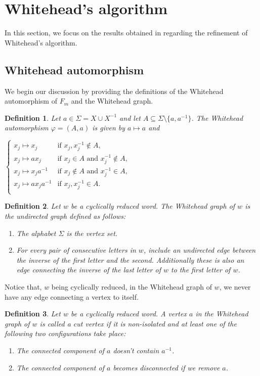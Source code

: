 \documentclass{article}
\newtheorem{mydef}{Definition}[section]
\begin{document}
\section{Whitehead’s algorithm}\label{sec:ascari}
In this section, we focus on the results obtained in \cite{ascari2021fine} regarding the refinement of Whitehead's algorithm. 
\subsection{Whitehead automorphism}
We begin our discussion by providing the definitions of the Whitehead automorphism of $F_m$ and the Whitehead graph. 
\begin{mydef}
Let $a\in\Sigma = X\cup X^{-1}$ and let $A\subseteq\Sigma\setminus\{a,a^{-1}\}$. The \emph{Whitehead automorphism} $\varphi=(A,a)$ is given by $a\mapsto a$ and
\begin{center}
$\begin{cases}
x_j\mapsto x_j & \text{if } x_j,x_j^{-1}\not\in A,\\
x_j\mapsto ax_j & \text{if } x_j\in A \text{ and } x_j^{-1}\not\in A,\\
x_j\mapsto x_ja^{-1} & \text{if } x_j\not\in A \text{ and } x_j^{-1}\in A,\\
x_j\mapsto ax_ja^{-1} & \text{if } x_j,x_j^{-1}\in A.\\
\end{cases}$
\end{center}
\end{mydef}

\begin{mydef}\label{defWhiteheadgraph}
Let $w$ be a cyclically reduced word. The \emph{Whitehead graph} of  $w$ is the undirected graph defined as follows:
\begin{enumerate}
    \item The alphabet $\Sigma$ is the vertex set.
    \item For every pair of consecutive letters in $w$, include an undirected edge between the inverse of the first letter and the second. Additionally these is also an edge connecting the inverse of the last letter of $w$ to the first letter of $w$.
\end{enumerate} 
\end{mydef}

Notice that, $w$ being cyclically reduced, in the Whitehead graph of $w$, we never have any edge connecting a vertex to itself.

\begin{mydef}\label{defcutvertex}
Let $w$ be a cyclically reduced word. A vertex $a$ in the Whitehead graph of $w$ is called a \emph{cut vertex} if it is non-isolated and at least one of the following two configurations take place:
\begin{enumerate}
    \item \label{def:cut1} The connected component of $a$ doesn't contain $a^{-1}$.
    \item \label{def:cut2}The connected component of $a$ becomes disconnected if we remove $a$.
\end{enumerate}
\end{mydef}
\end{document}
